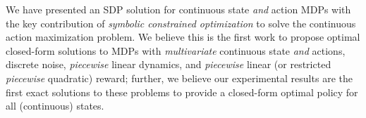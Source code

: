 \label{sec:conclusion}







%

We have presented an SDP solution for continuous state \emph{and}
action MDPs with the key contribution of \emph{symbolic constrained
optimization} to solve the continuous action maximization problem.  We
believe this is the first work to propose optimal closed-form
solutions to MDPs with \emph{multivariate} continuous state \emph{and}
actions, discrete noise, \emph{piecewise} linear dynamics, and
\emph{piecewise} linear (or restricted \emph{piecewise} quadratic)
reward; further, we believe our experimental results are the first
exact solutions to these problems to provide a closed-form optimal
policy for all (continuous) states.

